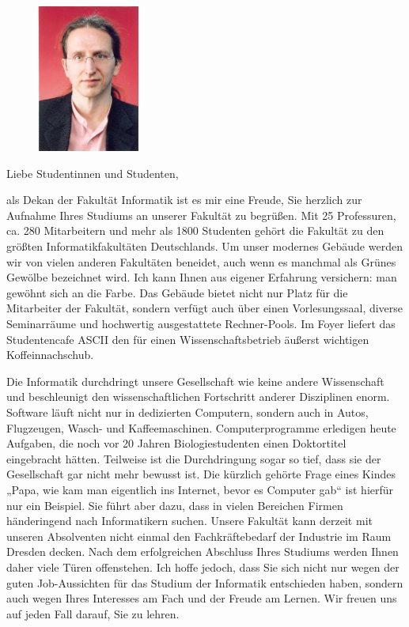 
\begin{figure}
  \vspace{-15pt}
  \begin{centering}
    \includegraphics[width=0.3\textwidth]{img/franzbaader.jpg}
  \end{centering}
  \vspace{-20pt}
\end{figure}

Liebe Studentinnen und Studenten,

als Dekan der Fakultät Informatik ist es mir eine Freude, Sie herzlich zur Aufnahme Ihres Studiums an unserer Fakultät zu begrüßen. Mit 25 Professuren, ca. 280 Mitarbeitern und mehr als 1800 Studenten gehört die Fakultät zu den größten Informatikfakultäten Deutschlands. Um unser modernes Gebäude werden wir von vielen anderen Fakultäten beneidet, auch wenn es manchmal als Grünes Gewölbe bezeichnet wird. Ich kann Ihnen aus eigener Erfahrung versichern: man gewöhnt sich an die Farbe. Das Gebäude bietet nicht nur Platz für die Mitarbeiter der Fakultät, sondern verfügt auch über einen Vorlesungssaal, diverse Seminarräume und hochwertig ausgestattete Rechner-Pools. Im Foyer liefert das Studentencafe ASCII den für einen Wissenschaftsbetrieb äußerst wichtigen Koffeinnachschub.

Die Informatik durchdringt unsere Gesellschaft wie keine andere Wissenschaft und beschleunigt den wissenschaftlichen Fortschritt anderer Disziplinen enorm. Software läuft nicht nur in dedizierten Computern, sondern auch in Autos, Flugzeugen, Wasch- und Kaffeemaschinen. Computerprogramme erledigen heute Aufgaben, die noch vor 20 Jahren Biologiestudenten einen Doktortitel eingebracht hätten. Teilweise ist die Durchdringung sogar so tief, dass sie der Gesellschaft gar nicht mehr bewusst ist. Die kürzlich gehörte Frage eines Kindes „Papa, wie kam man eigentlich ins Internet, bevor es Computer gab“ ist hierfür nur ein Beispiel. Sie führt aber dazu, dass in vielen Bereichen Firmen händeringend nach Informatikern suchen. Unsere Fakultät kann derzeit mit unseren Absolventen nicht einmal den Fachkräftebedarf der Industrie im Raum Dresden decken. Nach dem erfolgreichen Abschluss Ihres Studiums werden Ihnen daher viele Türen offenstehen. Ich hoffe jedoch, dass Sie sich nicht nur wegen der guten Job-Aussichten für das Studium der Informatik entschieden haben, sondern auch wegen Ihres Interesses am Fach und der Freude am Lernen. Wir freuen uns auf jeden Fall darauf, Sie zu lehren.


